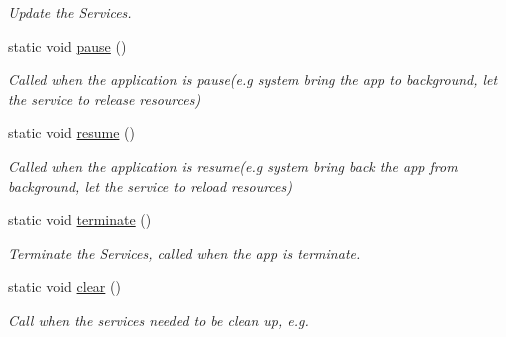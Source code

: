 \begin{DoxyCompactItemize}
\begin{DoxyCompactList}\small\item\em Update the Services. \end{DoxyCompactList}\item 
static void \hyperlink{struct_i_dream_sky_1_1_resource_access_1_1_service_a039af370ffb5a269043ea3fe913e5ceb}{pause} ()\hypertarget{struct_i_dream_sky_1_1_resource_access_1_1_service_a039af370ffb5a269043ea3fe913e5ceb}{}\label{struct_i_dream_sky_1_1_resource_access_1_1_service_a039af370ffb5a269043ea3fe913e5ceb}

\begin{DoxyCompactList}\small\item\em Called when the application is pause(e.\+g system bring the app to background, let the service to release resources) \end{DoxyCompactList}\item 
static void \hyperlink{struct_i_dream_sky_1_1_resource_access_1_1_service_ab56493e9374b0ccd48f4220e50c47ca8}{resume} ()\hypertarget{struct_i_dream_sky_1_1_resource_access_1_1_service_ab56493e9374b0ccd48f4220e50c47ca8}{}\label{struct_i_dream_sky_1_1_resource_access_1_1_service_ab56493e9374b0ccd48f4220e50c47ca8}

\begin{DoxyCompactList}\small\item\em Called when the application is resume(e.\+g system bring back the app from background, let the service to reload resources) \end{DoxyCompactList}\item 
static void \hyperlink{struct_i_dream_sky_1_1_resource_access_1_1_service_a88fa4d26819bb718e9147ab19a5e26d2}{terminate} ()\hypertarget{struct_i_dream_sky_1_1_resource_access_1_1_service_a88fa4d26819bb718e9147ab19a5e26d2}{}\label{struct_i_dream_sky_1_1_resource_access_1_1_service_a88fa4d26819bb718e9147ab19a5e26d2}

\begin{DoxyCompactList}\small\item\em Terminate the Services, called when the app is terminate. \end{DoxyCompactList}\item 
static void \hyperlink{struct_i_dream_sky_1_1_resource_access_1_1_service_a7862735921d483c1fa385b5568e1b778}{clear} ()
\begin{DoxyCompactList}\small\item\em Call when the services needed to be clean up, e.\+g. \end{DoxyCompactList}\end{DoxyCompactItemize}


